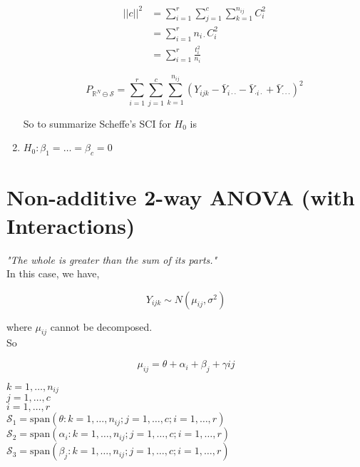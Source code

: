 \documentclass[11pt,fleqn]{book} %
\begin{document}
\begin{enumerate}[label = \Roman*]
		\begin{align*}
			||c||^2 &= \displaystyle \sum^r_{i=1} \sum^c_{j=1} \sum^{n_{ij}}_{k=1}  C_i^2\\
				&= \displaystyle \sum^r_{i=1} n_{i \cdot} C_i^2\\
				&= \displaystyle \sum^r_{i=1} \frac{t_i^2}{n_i}
		\end{align*}


		$$ P_{\mathbb{R}^N \ominus \mathcal{S}} = \displaystyle \sum^r_{i=1} \sum^c_{j=1} \sum^{n_{ij}}_{k=1} (Y_{ijk} - \bar{Y}_{i\cdot \cdot} - \bar{Y}_{\cdot i \cdot} + \bar{Y}_{\cdot \cdot \cdot})^2$$

So to summarize Scheffe's SCI for $H_0$ is 



		\item $H_0: \beta_1 = \dots = \beta_c = 0$


	\end{enumerate}
 


\section{Non-additive 2-way ANOVA (with Interactions)}

\textit{"The whole is greater than the sum of its parts."}\\

In this case, we have, 

		$$Y_{ijk} \sim N(\mu_{ij}, \sigma^2) $$

where $\mu_{ij}$ cannot be decomposed. \\

So 

		$$\mu_{ij} = \theta + \alpha_i + \beta_j + \gamma{ij} $$

$k = 1, \dots, n_{ij}$\\
$ j = 1, \dots, c$\\
$ i = 1, \dots, r $\\

$\mathcal{S}_1 = \text{span}(\theta: k = 1, \dots, n_{ij}; j = 1, \dots, c; i = 1, \dots, r )$\\

$\mathcal{S}_2 = \text{span}(\alpha_i: k = 1, \dots, n_{ij}; j = 1, \dots, c; i = 1, \dots, r )$\\

$\mathcal{S}_3 = \text{span}(\beta_j: k = 1, \dots, n_{ij}; j = 1, \dots, c; i = 1, \dots, r )$\\
\end{document}
